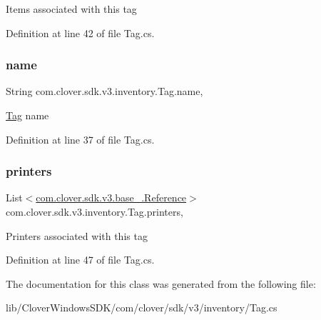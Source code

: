 Items associated with this tag 



Definition at line 42 of file Tag.\+cs.

\mbox{\label{classcom_1_1clover_1_1sdk_1_1v3_1_1inventory_1_1_tag_a76027ac5f4401863de1d8ad2264bec1a}} 
\subsubsection{\texorpdfstring{name}{name}}
{\footnotesize\ttfamily String com.\+clover.\+sdk.\+v3.\+inventory.\+Tag.\+name\hspace{0.3cm}{\ttfamily [get]}, {\ttfamily [set]}}



\hyperlink{classcom_1_1clover_1_1sdk_1_1v3_1_1inventory_1_1_tag}{Tag} name 



Definition at line 37 of file Tag.\+cs.

\mbox{\label{classcom_1_1clover_1_1sdk_1_1v3_1_1inventory_1_1_tag_a438066f64ef237f00ee7af37f43e9674}} 
\subsubsection{\texorpdfstring{printers}{printers}}
{\footnotesize\ttfamily List$<$\hyperlink{classcom_1_1clover_1_1sdk_1_1v3_1_1base___1_1_reference}{com.\+clover.\+sdk.\+v3.\+base\+\_\+.\+Reference}$>$ com.\+clover.\+sdk.\+v3.\+inventory.\+Tag.\+printers\hspace{0.3cm}{\ttfamily [get]}, {\ttfamily [set]}}



Printers associated with this tag 



Definition at line 47 of file Tag.\+cs.



The documentation for this class was generated from the following file\+:\begin{DoxyCompactItemize}
\item 
lib/\+Clover\+Windows\+S\+D\+K/com/clover/sdk/v3/inventory/Tag.\+cs\end{DoxyCompactItemize}
